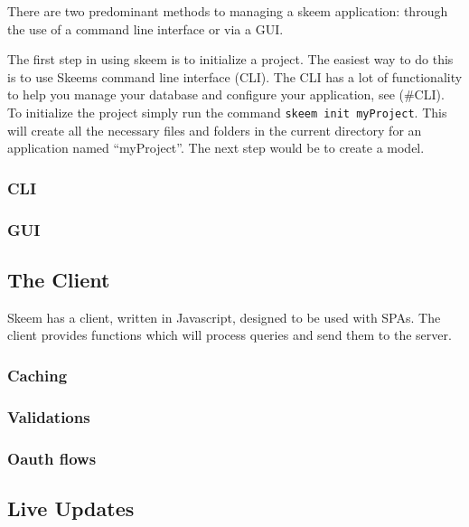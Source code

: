 \documentclass[
  12pt,
]{article}
\newcommand{\passthrough}[1]{#1}
\begin{document}
There are two predominant methods to managing a skeem application:
through the use of a command line interface or via a GUI.

The first step in using skeem is to initialize a project. The easiest
way to do this is to use Skeems command line interface (CLI). The CLI
has a lot of functionality to help you manage your database and
configure your application, see (\#CLI). To initialize the project
simply run the command \passthrough{\lstinline!skeem init myProject!}.
This will create all the necessary files and folders in the current
directory for an application named ``myProject''. The next step would be
to create a model.

\hypertarget{cli}{%
\subsubsection{CLI}\label{cli}}

\hypertarget{gui}{%
\subsubsection{GUI}\label{gui}}

\hypertarget{the-client}{%
\subsection{The Client}\label{the-client}}

Skeem has a client, written in Javascript, designed to be used with
SPAs. The client provides functions which will process queries and send
them to the server.

\hypertarget{caching}{%
\subsubsection{Caching}\label{caching}}

\hypertarget{validations}{%
\subsubsection{Validations}\label{validations}}

\hypertarget{oauth-flows}{%
\subsubsection{Oauth flows}\label{oauth-flows}}

\hypertarget{live-updates}{%
\subsection{Live Updates}\label{live-updates}}
\end{document}
